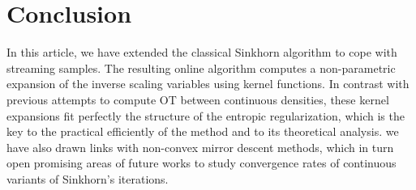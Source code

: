 
\section{Conclusion}

In this article, we have extended the classical Sinkhorn algorithm to cope with streaming samples. The resulting online algorithm computes a non-parametric expansion of the inverse scaling variables using kernel functions. In contrast with previous attempts to compute OT between continuous densities, these kernel expansions fit perfectly the structure of the entropic regularization, which is the key to the practical efficiently of the method and to its theoretical analysis. 
%
we have also drawn links with non-convex mirror descent methods, which in turn open promising areas of future works to study convergence rates of continuous variants of Sinkhorn's iterations.
\vfill